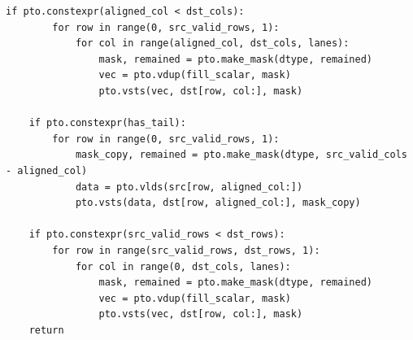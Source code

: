 \begin{lstlisting}[style=ptocode]
    if pto.constexpr(aligned_col < dst_cols):
        for row in range(0, src_valid_rows, 1):
            for col in range(aligned_col, dst_cols, lanes):
                mask, remained = pto.make_mask(dtype, remained)
                vec = pto.vdup(fill_scalar, mask)
                pto.vsts(vec, dst[row, col:], mask)

    if pto.constexpr(has_tail):
        for row in range(0, src_valid_rows, 1):
            mask_copy, remained = pto.make_mask(dtype, src_valid_cols - aligned_col)
            data = pto.vlds(src[row, aligned_col:])
            pto.vsts(data, dst[row, aligned_col:], mask_copy)

    if pto.constexpr(src_valid_rows < dst_rows):
        for row in range(src_valid_rows, dst_rows, 1):
            for col in range(0, dst_cols, lanes):
                mask, remained = pto.make_mask(dtype, remained)
                vec = pto.vdup(fill_scalar, mask)
                pto.vsts(vec, dst[row, col:], mask)
    return
\end{lstlisting}
\Needspace{0.34\textheight}
